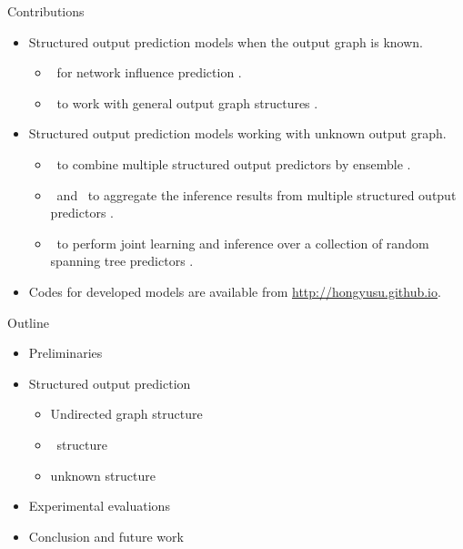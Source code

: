 \documentclass[first=dgreen,second=purple,logo=yellowexc]{aaltoslides}
\begin{document}
%
\begin{frame}{Contributions}
	\begin{itemize}\footnotesize
		\item Structured output prediction models when the output graph is known.
		\begin{itemize}\footnotesize
			\item \spin\ for network influence prediction \cite{su14structured}.
			\item \mmcrf\ to work with general output graph structures \cite{su10structured}.
		\end{itemize}
		\item Structured output prediction models working with unknown output graph.
		\begin{itemize}\footnotesize
			\item \mve\ to combine multiple structured output predictors by ensemble \cite{su11mutitask}.
			\item \amm\ and \mam\ to aggregate the inference results from multiple structured output predictors \cite{su2013multilabelacml,su15multilabel}.
			\item \rta\ to perform joint learning and inference over a collection of random spanning tree predictors \cite{su14multilabelnips}.
		\end{itemize}
		\item Codes for developed models are available from \href{http://hongyusu.github.io}{http://hongyusu.github.io}.
	\end{itemize}
\end{frame}


%
\begin{frame}{Outline}
	\begin{itemize}\footnotesize
		\item Preliminaries
		\item Structured output prediction
		\begin{itemize}\footnotesize
			\item Undirected graph structure
			\item \daggraph\ structure
			\item unknown structure
		\end{itemize}
		\item Experimental evaluations
		\item Conclusion and future work
	\end{itemize}
\end{frame}
\end{document}
